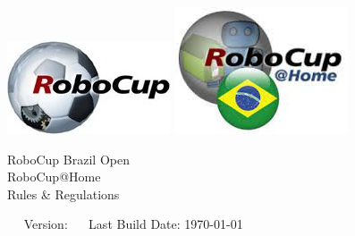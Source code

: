 \begin{titlepage}
  \begin{center}
    {
      \includegraphics[width=.25\textwidth]{images/logo_RoboCupFed.jpg}
      \hfill
      \includegraphics[width=.23\textwidth]{images/logo_rcbrazilhome.png}\\
      [1.23ex]
    }
    \vspace{2.7 cm}
    \hrulefill\par
    {%
      \vspace*{.27cm}
      \Huge{RoboCup Brazil Open}\\[1.23ex]
      \Huge{RoboCup@Home}\\[1.23ex]
      \Large Rules \& Regulations \\[2ex]
    }
    \hrulefill\par
    \vfill
    ~~ Version: \YEAR 
    ~~ Last Build Date: \today \quad 
  \end{center}
\end{titlepage}
